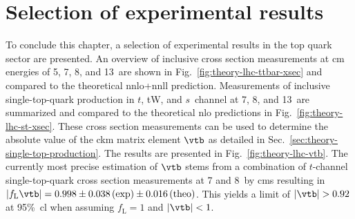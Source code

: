\section{Selection of experimental results}
\label{sec:theory-exp-results}


To conclude this chapter, a selection of experimental results in the top quark sector are presented. An overview of inclusive \ttbar cross section measurements at \acrlong{cm} energies of 5, 7, 8, and 13~\TeV are shown in Fig.~\ref{fig:theory-lhc-ttbar-xsec} and compared to the theoretical \gls{nnlo}+\gls{nnll} prediction. Measurements of inclusive single-top-quark production in $t$, tW, and $s$~channel at 7, 8, and 13~\TeV are summarized and compared to the theoretical \gls{nlo} predictions in Fig.~\ref{fig:theory-lhc-st-xsec}. These cross section measurements can be used to determine the absolute value of the \gls{ckm} matrix element $\vtb$ as detailed in Sec.~\ref{sec:theory-single-top-production}. The results are presented in Fig.~\ref{fig:theory-lhc-vtb}. The currently most precise estimation of $\vtb$ stems from a combination of $t$-channel single-top-quark cross section measurements at 7 and 8~\TeV by \gls{cms} resulting in $|f_\mathrm{L}\vtb|=0.998\pm0.038\,\mathrm{(exp)}\pm0.016\,\mathrm{(theo)}$. This yields a limit of $|\vtb|>0.92$ at 95\%~\gls{cl} when assuming $f_\mathrm{L}=1$ and $|\vtb|<1$.


